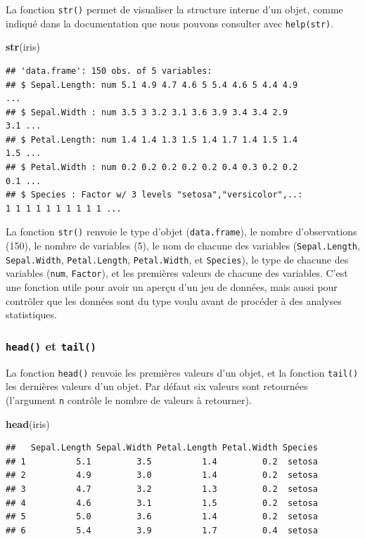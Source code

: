 \documentclass[twoside,symmetric]{book}
\newenvironment{Shaded}{}{}
\newcommand{\KeywordTok}[1]{\textbf{#1}}
\newcommand{\NormalTok}[1]{#1}
\begin{document}
La fonction \texttt{str()} permet de visualiser la structure interne d'un objet, comme indiqué dans la documentation que nous pouvons consulter avec \texttt{help(str)}.

\begin{Shaded}
\begin{Highlighting}[]
\KeywordTok{str}\NormalTok{(iris)}
\end{Highlighting}
\end{Shaded}

\begin{verbatim}
## 'data.frame': 150 obs. of 5 variables:
## $ Sepal.Length: num 5.1 4.9 4.7 4.6 5 5.4 4.6 5 4.4 4.9
...
## $ Sepal.Width : num 3.5 3 3.2 3.1 3.6 3.9 3.4 3.4 2.9
3.1 ...
## $ Petal.Length: num 1.4 1.4 1.3 1.5 1.4 1.7 1.4 1.5 1.4
1.5 ...
## $ Petal.Width : num 0.2 0.2 0.2 0.2 0.2 0.4 0.3 0.2 0.2
0.1 ...
## $ Species : Factor w/ 3 levels "setosa","versicolor",..:
1 1 1 1 1 1 1 1 1 1 ...
\end{verbatim}

La fonction \texttt{str()} renvoie le type d'objet (\texttt{data.frame}), le nombre d'observations (150), le nombre de variables (5), le nom de chacune des variables (\texttt{Sepal.Length}, \texttt{Sepal.Width}, \texttt{Petal.Length}, \texttt{Petal.Width}, et \texttt{Species}), le type de chacune des variables (\texttt{num}, \texttt{Factor}), et les premières valeurs de chacune des variables. C'est une fonction utile pour avoir un aperçu d'un jeu de données, mais aussi pour contrôler que les données sont du type voulu avant de procéder à des analyses statistiques.

\hypertarget{l015head}{%
\subsubsection{\texorpdfstring{\texttt{head()} et \texttt{tail()}}{head() et tail()}}\label{l015head}}

La fonction \texttt{head()} renvoie les premières valeurs d'un objet, et la fonction \texttt{tail()} les dernières valeurs d'un objet. Par défaut six valeurs sont retournées (l'argument \texttt{n} contrôle le nombre de valeurs à retourner).

\begin{Shaded}
\begin{Highlighting}[]
\KeywordTok{head}\NormalTok{(iris)}
\end{Highlighting}
\end{Shaded}

\begin{verbatim}
##   Sepal.Length Sepal.Width Petal.Length Petal.Width Species
## 1          5.1         3.5          1.4         0.2  setosa
## 2          4.9         3.0          1.4         0.2  setosa
## 3          4.7         3.2          1.3         0.2  setosa
## 4          4.6         3.1          1.5         0.2  setosa
## 5          5.0         3.6          1.4         0.2  setosa
## 6          5.4         3.9          1.7         0.4  setosa
\end{verbatim}
\end{document}
